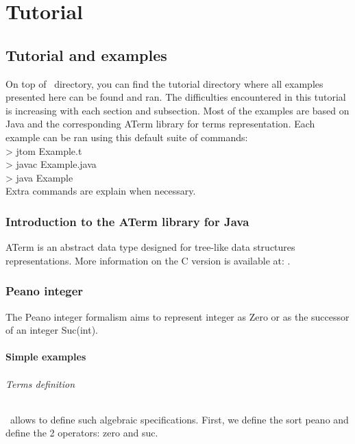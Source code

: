 \part{Tutorial}
\chapter{Tutorial and examples}

On top of \TOM\ directory, you can find the tutorial directory where
all examples presented here can be found and ran.
The difficulties encountered in this tutorial is increasing with each
section and subsection. Most of the examples are based on Java and the
corresponding ATerm library for terms representation.
Each example can be ran using this default suite of commands:
\\> jtom Example.t
\\> javac Example.java
\\> java Example
\\Extra commands are explain when necessary.

\section{Introduction to the ATerm library for Java}

ATerm is an abstract data type designed for tree-like data structures
representations.
More information on the C version is available at: 
.

\section{Peano integer}

The Peano integer formalism aims to represent integer as Zero or as the
successor of an integer Suc(int).

\subsection{Simple examples}
\paragraph{Terms definition}
\TOM\ allows to define such algebraic specifications. First, we define
the sort \textsf{peano} and define the 2 operators: \textsf{zero} and \textsf{suc}.

